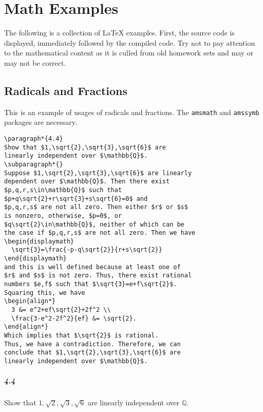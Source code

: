 \chapter{Math Examples}
\label{cha:math-examples}

The following is a collection of \LaTeX{} examples.  First, the source
code is displayed, immediately followed by the compiled code.  Try not
to pay attention to the mathematical content as it is culled from old
homework sets and may or may not be correct.

\section{Radicals and Fractions}
\label{sec:radicals-fractions}

This is an example of usages of radicals and fractions.  The
\texttt{amsmath} and \texttt{amssymb} packages are necessary.

\begin{verbatim}
\paragraph*{4.4}
Show that $1,\sqrt{2},\sqrt{3},\sqrt{6}$ are
linearly independent over $\mathbb{Q}$.
\subparagraph*{}
Suppose $1,\sqrt{2},\sqrt{3},\sqrt{6}$ are linearly
dependent over $\mathbb{Q}$. Then there exist
$p,q,r,s\in\mathbb{Q}$ such that
$p+q\sqrt{2}+r\sqrt{3}+s\sqrt{6}=0$ and
$p,q,r,s$ are not all zero. Then either $r$ or $s$
is nonzero, otherwise, $p=0$, or
$q\sqrt{2}\in\mathbb{Q}$, neither of which can be
the case if $p,q,r,s$ are not all zero. Then we have
\begin{displaymath}
  \sqrt{3}=\frac{-p-q\sqrt{2}}{r+s\sqrt{2}}
\end{displaymath}
and this is well defined because at least one of
$r$ and $s$ is not zero. Thus, there exist rational
numbers $e,f$ such that $\sqrt{3}=e+f\sqrt{2}$.
Squaring this, we have
\begin{align*}
  3 &= e^2+ef\sqrt{2}+2f^2 \\
  \frac{3-e^2-2f^2}{ef} &= \sqrt{2}.
\end{align*}
Which implies that $\sqrt{2}$ is rational.
Thus, we have a contradiction. Therefore, we can
conclude that $1,\sqrt{2},\sqrt{3},\sqrt{6}$ are
linearly independent over $\mathbb{Q}$.
\end{verbatim}

\paragraph*{4.4}
Show that $1,\sqrt{2},\sqrt{3},\sqrt{6}$ are linearly independent over
$\mathbb{Q}$.

